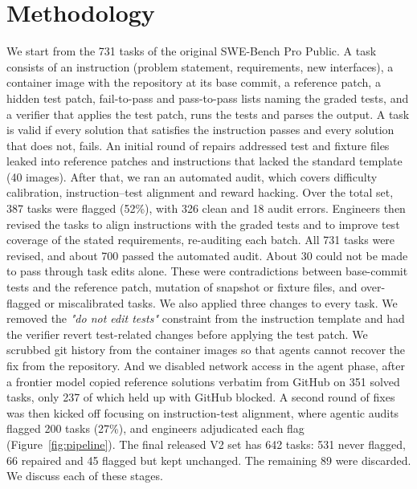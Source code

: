 \section{Methodology}
\label{sec:method}

We start from the 731 tasks of the original SWE-Bench Pro Public. A task consists of an instruction (problem statement, requirements, new interfaces), a container image with the repository at its base commit, a reference patch, a hidden test patch, fail-to-pass and pass-to-pass lists naming the graded tests, and a verifier that applies the test patch, runs the tests and parses the output. A task is valid if every solution that satisfies the instruction passes and every solution that does not, fails. An initial round of repairs addressed test and fixture files leaked into reference patches and instructions that lacked the standard template (40 images). After that, we ran an automated audit, which covers difficulty calibration, instruction–test alignment and reward hacking. Over the total set, 387 tasks were flagged (52\%), with 326 clean and 18 audit errors. Engineers then revised the tasks to align instructions with the graded tests and to improve test coverage of the stated requirements, re-auditing each batch. All 731 tasks were revised, and about 700 passed the automated audit. About 30 could not be made to pass through task edits alone. These were contradictions between base-commit tests and the reference patch, mutation of snapshot or fixture files, and over-flagged or miscalibrated tasks. We also applied three changes to every task. We removed the \textit{"do not edit tests"} constraint from the instruction template and had the verifier revert test-related changes before applying the test patch. We scrubbed git history from the container images so that agents cannot recover the fix from the repository. And we disabled network access in the agent phase, after a frontier model copied reference solutions verbatim from GitHub on 351 solved tasks, only 237 of which held up with GitHub blocked. A second round of fixes was then kicked off focusing on instruction-test alignment, where agentic audits flagged 200 tasks (27\%), and engineers adjudicated each flag (Figure~\ref{fig:pipeline}). The final released V2 set has 642 tasks: 531 never flagged, 66 repaired and 45 flagged but kept unchanged. The remaining 89 were discarded. We discuss each of these stages.
